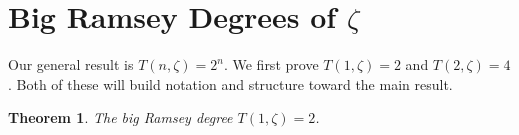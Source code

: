 \documentclass[11pt]{article}
\newcommand{\numpoints}{n}
\theoremstyle{plain}
\newtheorem{theorem}{Theorem}[section]
\theoremstyle{definition}
\begin{document}


\section{Big Ramsey Degrees of \texorpdfstring{$\zeta$}{Z}}\label{se:Z}


Our general result is $T(n, \zeta) = 2^n$.
We first prove $T(1,\zeta)=2$
and $T(2,\zeta)=4$. Both of these will 
build notation and structure toward the main result.

\begin{theorem}
The big Ramsey degree $T(1,\zeta)=2$. 
\end{theorem}
\end{document}
